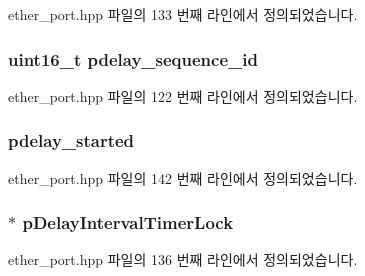 ether\+\_\+port.\+hpp 파일의 133 번째 라인에서 정의되었습니다.

\subsubsection[{\texorpdfstring{pdelay\+\_\+sequence\+\_\+id}{pdelay_sequence_id}}]{\setlength{\rightskip}{0pt plus 5cm}uint16\+\_\+t pdelay\+\_\+sequence\+\_\+id\hspace{0.3cm}{\ttfamily [private]}}\hypertarget{class_ether_port_a4dfd3d01701b921f6d7adcdcfd640e60}{}\label{class_ether_port_a4dfd3d01701b921f6d7adcdcfd640e60}


ether\+\_\+port.\+hpp 파일의 122 번째 라인에서 정의되었습니다.

\subsubsection[{\texorpdfstring{pdelay\+\_\+started}{pdelay_started}}]{ pdelay\+\_\+started\hspace{0.3cm}{\ttfamily [private]}}\hypertarget{class_ether_port_af9e28e779ea4250af88009ccf7b783e6}{}\label{class_ether_port_af9e28e779ea4250af88009ccf7b783e6}


ether\+\_\+port.\+hpp 파일의 142 번째 라인에서 정의되었습니다.

\subsubsection[{\texorpdfstring{p\+Delay\+Interval\+Timer\+Lock}{pDelayIntervalTimerLock}}]{$\ast$ p\+Delay\+Interval\+Timer\+Lock\hspace{0.3cm}{\ttfamily [private]}}\hypertarget{class_ether_port_aa3a07b2cba419592d5cea3e6b944ff32}{}\label{class_ether_port_aa3a07b2cba419592d5cea3e6b944ff32}


ether\+\_\+port.\+hpp 파일의 136 번째 라인에서 정의되었습니다.

